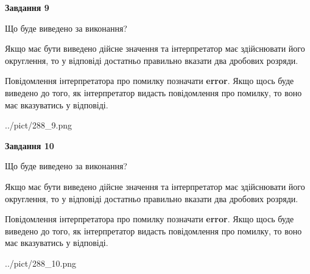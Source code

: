 \documentclass[12pt, ukrainian]{article}
\begin{document}
{\begin {Large}
{\begin {center}\textbf{Завдання 9}\end {center}}\par
Що буде виведено за виконання? \par

Якщо має бути виведено дійсне значення та інтерпретатор має здійснювати його округлення, 
то у відповіді достатньо правильно вказати два дробових розряди.

Повідомлення інтерпретатора про помилку позначати \textbf{error}.
Якщо щось буде виведено до того, як інтерпретатор видасть повідомлення про помилку, 
то воно має вказуватись у відповіді. \par

\begin{center}
	{../pict/288_9.png}
\end{center}
\newpage

{\begin {center}\textbf{Завдання 10}\end {center}}\par
Що буде виведено за виконання? \par

Якщо має бути виведено дійсне значення та інтерпретатор має здійснювати його округлення, 
то у відповіді достатньо правильно вказати два дробових розряди.

Повідомлення інтерпретатора про помилку позначати \textbf{error}.
Якщо щось буде виведено до того, як інтерпретатор видасть повідомлення про помилку, 
то воно має вказуватись у відповіді. \par

\begin{center}
	{../pict/288_10.png}
\end{center}
\newpage

\end {Large}}
\end{document}
